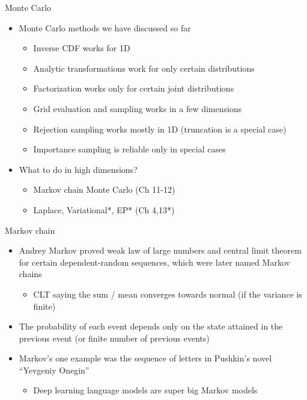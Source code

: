 \documentclass[finnish,english,t]{beamer}
\renewcommand{\emph}[1]{\textcolor{navyblue}{#1}}
\begin{document}
\begin{frame}{Monte Carlo}

  \begin{itemize}
  \item Monte Carlo methods we have discussed so far
    \begin{itemize}
    \item Inverse CDF works for 1D
    \item Analytic transformations work for only certain distributions
    \item Factorization works only for certain joint distributions
    \item Grid evaluation and sampling works in a few dimensions
    \item Rejection sampling works mostly in 1D (truncation is a special case)
    \item Importance sampling is reliable only in special cases
    \end{itemize}
    \pause
  \item What to do in high dimensions?
    \begin{itemize}
    \item Markov chain Monte Carlo (Ch 11-12)
    \item Laplace, Variational*, EP* (Ch 4,13*)
    \end{itemize}
  \end{itemize}
\end{frame}


\begin{frame}{Markov chain}

  \begin{itemize}
  \item<1-> \emph{Andrey Markov} proved weak law of large numbers and central
    limit theorem for certain dependent-random sequences, which were
    later named Markov chains
    \begin{itemize}
    \item {\color{gray} CLT saying the sum / mean converges towards normal (if the variance is finite)}
    \end{itemize}
  \item<2-> The probability of each event depends only on the state
    attained in the previous event (or finite number of previous events)
  \item<3-> Markov's one example was the sequence of letters in
    Pushkin's novel ``Yevgeniy Onegin''
    \begin{itemize}
    \item<4-> {\color{gray} Deep learning language models are super
        big Markov models}
    \end{itemize}
  \end{itemize}

\end{frame}  
\end{document}
